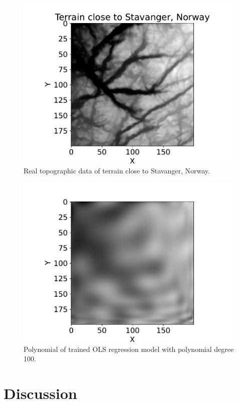 \documentclass[12pt]{article}
\begin{document}
\begin{figure}
    \centering
    \includegraphics[width=0.8\linewidth]{images/part_g_real_data.pdf}
    \caption{Real topographic data of terrain close to Stavanger, Norway.}
    \label{fig:part_g_real_data}
\end{figure}


\begin{figure}
    \centering
    \includegraphics[width=0.8\linewidth]{images/part_g_fit_data_deg100_plot.pdf}
    \caption{Polynomial of trained OLS regression model with polynomial degree 100.}
    \label{fig:part_g_fit_data_deg100_plot}
\end{figure}

\newpage
\section{Discussion} \label{sec:discussion}
\end{document}
